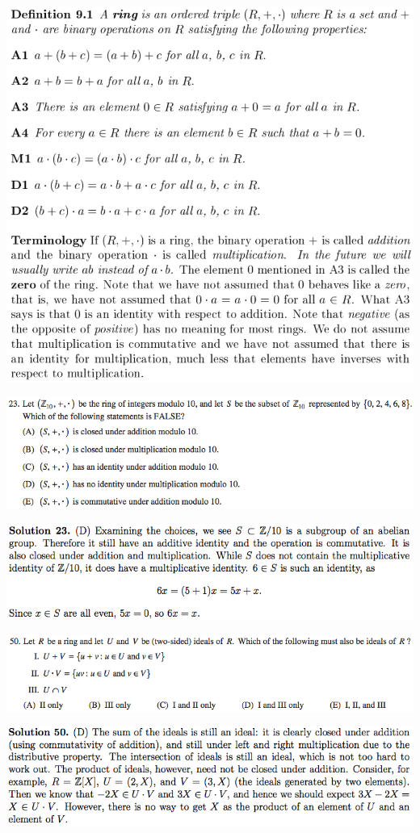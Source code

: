 \documentclass{article}
\begin{document}
\includegraphics[scale=0.45]{ring_summary}

\includegraphics[scale=0.65]{1268_23}

\includegraphics[scale=0.65]{1268_23s}

\includegraphics[scale=0.65]{1268_50}

\includegraphics[scale=0.65]{1268_50s}
\end{document}
